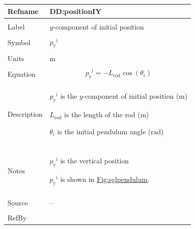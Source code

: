 \documentclass[12pt]{article}
\begin{document}
\vspace{\baselineskip}
\noindent
\begin{minipage}{\textwidth}
\begin{tabular}{>{\raggedright}p{}>{\raggedright\arraybackslash}p{}}
\toprule \textbf{Refname} & \textbf{DD:positionIY}
\label{DD:positionIY}
\\ \midrule \\
Label & $y$-component of initial position
        
\\ \midrule \\
Symbol & ${{p_{\text{y}}}^{\text{i}}}$
         
\\ \midrule \\
Units & ${\text{m}}$
        
\\ \midrule \\
Equation & \begin{displaymath}
           {{p_{\text{y}}}^{\text{i}}}=-{L_{\text{rod}}} \cos\left({θ_{i}}\right)
           \end{displaymath}
\\ \midrule \\
Description & \begin{symbDescription}
              \item{${{p_{\text{y}}}^{\text{i}}}$ is the $y$-component of initial position (${\text{m}}$)}
              \item{${L_{\text{rod}}}$ is the length of the rod (${\text{m}}$)}
              \item{${θ_{i}}$ is the initial pendulum angle (${\text{rad}}$)}
              \end{symbDescription}
\\ \midrule \\
Notes & ${{p_{\text{y}}}^{\text{i}}}$ is the vertical position
        
        ${{p_{\text{y}}}^{\text{i}}}$ is shown in \hyperref[Figure:sglpendulum]{Fig:sglpendulum}.
        
\\ \midrule \\
Source & --
         
\\ \midrule \\
RefBy & 
\\ \bottomrule
\end{tabular}
\end{minipage}
\end{document}

